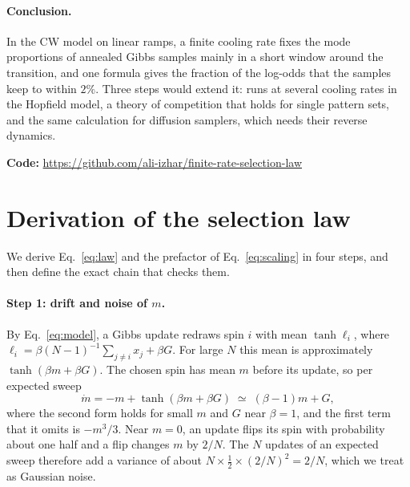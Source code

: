 \documentclass[final]{dynafront2026}
\begin{document}
\paragraph{Conclusion.}
In the CW model on linear ramps, a finite cooling rate fixes the mode
proportions of annealed Gibbs samples mainly in a short window around the
transition, and one formula gives the fraction of the log-odds that the
samples keep to within $2\%$. Three steps would extend it: runs at several
cooling rates in the Hopfield model, a theory of competition that holds for
single pattern sets, and the same calculation for diffusion samplers, which
needs their reverse dynamics.

\smallskip\noindent\textbf{Code:}\hspace{1em}%
\url{https://github.com/ali-izhar/finite-rate-selection-law}

\label{main-text-end}



\appendix

\section{Derivation of the selection law}
\label{app:exact}

We derive Eq.~\eqref{eq:law} and the prefactor of Eq.~\eqref{eq:scaling} in
four steps, and then define the exact chain that checks them.

\paragraph{Step 1: drift and noise of $m$.}
By Eq.~\eqref{eq:model}, a Gibbs update redraws spin $i$ with mean
$\tanh\ell_i$, where $\ell_i=\beta(N-1)^{-1}\sum_{j\ne i}x_j+\beta G$. For
large $N$ this mean is approximately $\tanh(\beta m+\beta G)$. The chosen
spin has mean $m$ before its update, so per expected sweep
\[
 \dot m=-m+\tanh(\beta m+\beta G)\;\simeq\;(\beta-1)m+G ,
\]
where the second form holds for small $m$ and $G$ near $\beta=1$, and the
first term that it omits is $-m^3/3$. Near $m=0$, an update flips its spin
with probability about one half and a flip changes $m$ by $2/N$. The $N$
updates of an expected sweep therefore add a variance of about
$N\times\tfrac12\times(2/N)^2=2/N$, which we treat as Gaussian noise.
\end{document}
